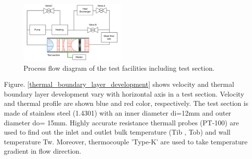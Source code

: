 \documentclass[conference]{IEEEtran}
\begin{document}
\begin{figure}[htbp]
\centering
\vspace{-4zh}
\includegraphics[width=0.47\textwidth,natwidth=920,natheight=700]{fig/experimental_loop.png}
\caption{Process flow diagram of the test facilities including test section.}
\label{experimental_loop}
\end{figure}

Figure. \ref{thermal_boundary_layer_development} shows velocity and thermal boundary layer development vary with horizontal axis in a test section.
Velocity and thermal profile are shown blue and red color, respectively.
The test section is made of stainless steel (1.4301) with an inner diameter di=12mm and outer diameter do= 15mm.
Highly accurate resistance thermall probes (PT-100) are used to find out the inlet and outlet bulk temperature (Tib , Tob) and wall temperature Tw.
Moreover, thermocouple 'Type-K' are used to take temperature gradient in flow direction.
\end{document}

